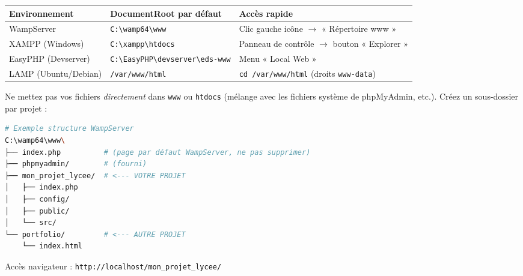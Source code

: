 \documentclass[11pt]{article}
\begin{document}
\begin{propriete}
\begin{center}
\begin{tabularx}{\linewidth}{|l|l|X|}
\hline
\rowcolor{popblueL} \textbf{Environnement} & \textbf{DocumentRoot par défaut} & \textbf{Accès rapide} \\
\hline
WampServer & \texttt{C:\textbackslash wamp64\textbackslash www} & Clic gauche icône $\rightarrow$ « Répertoire www » \\
\hline
XAMPP (Windows) & \texttt{C:\textbackslash xampp\textbackslash htdocs} & Panneau de contrôle $\rightarrow$ bouton « Explorer » \\
\hline
EasyPHP (Devserver) & \texttt{C:\textbackslash EasyPHP\textbackslash devserver\textbackslash eds-www} & Menu « Local Web » \\
\hline
LAMP (Ubuntu/Debian) & \texttt{/var/www/html} & \texttt{cd /var/www/html} (droits \texttt{www-data}) \\
\hline
\end{tabularx}
\end{center}
\end{propriete}

\begin{exemplebox}
Ne mettez pas vos fichiers \emph{directement} dans \texttt{www} ou \texttt{htdocs} (mélange avec les fichiers système de phpMyAdmin, etc.). Créez un sous-dossier par projet :
\begin{lstlisting}[language=bash]
# Exemple structure WampServer
C:\wamp64\www\
├── index.php          # (page par défaut WampServer, ne pas supprimer)
├── phpmyadmin/        # (fourni)
├── mon_projet_lycee/  # <--- VOTRE PROJET
│   ├── index.php
│   ├── config/
│   ├── public/
│   └── src/
└── portfolio/         # <--- AUTRE PROJET
    └── index.html
\end{lstlisting}
Accès navigateur : \texttt{http://localhost/mon\_projet\_lycee/}
\end{exemplebox}
\end{document}
